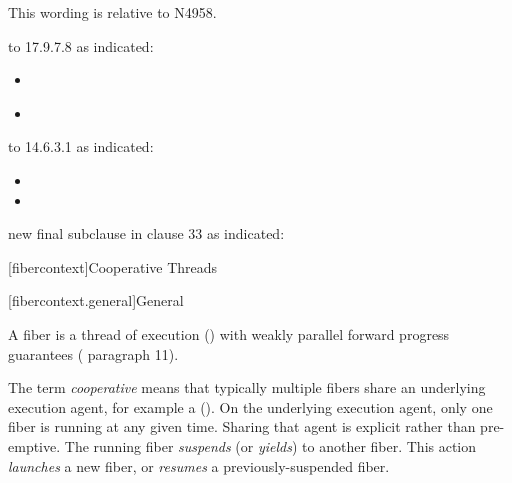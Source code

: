 \newpage
{}\label{api}

This wording is relative to N4958.\cite{Standard}

 to 17.9.7.8  as indicated:

\begin{itemize}
    \item {}\\
    \item {}\\
\end{itemize}

 to 14.6.3.1  as indicated:

\begin{itemize}
    \item {}
    \item {}
\end{itemize}

 new final subclause in clause 33  as indicated:

\setcounter{section}{33}
\setcounter{subsection}{11}
\setcounter{secnumdepth}{5}

[fibercontext]{Cooperative Threads}

[fibercontext.general]{General}

\para A fiber is a thread of execution () with
weakly parallel forward progress guarantees ( paragraph 11).

\para The term \emph{cooperative} means that typically multiple fibers share
an underlying execution agent, for example a 
(). On the underlying execution agent, only one
fiber is running at any given time. Sharing that agent is explicit rather than
pre-emptive. The running fiber \emph{suspends} (or \emph{yields}) to another
fiber. This action \emph{launches} a new fiber, or \emph{resumes} a
previously-suspended fiber.

